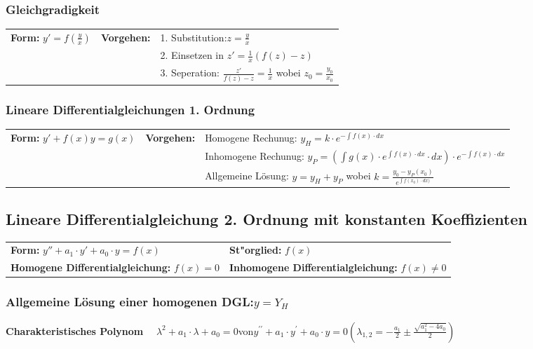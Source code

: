\subsubsection{Gleichgradigkeit}
\begin{tabular}{p{4cm}p{1.5cm}p{10.5cm}}
\textbf{Form:} $y'=f(\frac{y}{x})$ &
\textbf{Vorgehen:}                &
1. Substitution:\quad $z=\frac{y}{x}$\\ &&
2. Einsetzen in $z'=\frac{1}{x}(f(z)-z)$\\ &&
3. Seperation: $\frac{z'}{f(z)-z} = \frac{1}{x}$ wobei $z_0 = \frac{y_0}{x_0}$ 
\end{tabular}
\newline
\newline

\subsubsection{Lineare Differentialgleichungen 1. Ordnung }
\begin{tabular}{p{4cm}p{1.5cm}p{10.5cm}}
\textbf{Form:} $ y'+f(x)y = g(x) $ &
\textbf{Vorgehen:}                 &
Homogene Rechunug: $y_H = k \cdot e^{-\int f(x) \cdot dx}$\\ &&
Inhomogene Rechunug: $y_P = (\int g(x) \cdot e^{\int f(x) \cdot dx} \cdot dx)
\cdot e^{-\int f(x) \cdot dx}$\\ &&
Allgemeine Lösung: $y = y_H + y_P$ wobei $k = \frac{y_0 - y_P(x_0)}{e^{\int
f(x_0) \cdot dx)}}$
\end{tabular}

\subsection{Lineare Differentialgleichung 2. Ordnung mit konstanten 
Koeffizienten }
\begin{tabular}{p{8cm}p{8cm}}
\textbf{Form:} $y''+a_1\cdot y'+a_0\cdot y=f(x)$  &
\textbf{St"orglied:} $f(x)$\\
\textbf{Homogene Differentialgleichung:} $f(x)=0$ &
\textbf{Inhomogene Differentialgleichung:} $f(x)\neq 0$
\end{tabular}

\subsubsection{Allgemeine Lösung einer homogenen DGL:\quad $y=Y_H$}
\textbf{Charakteristisches Polynom} $\quad \lambda^{2}+a_{1} \cdot \lambda+a_{0}=0$\quad  von\quad $y^{\prime \prime}+a_{1} \cdot y^{\prime}+a_{0} \cdot y=0$\quad $\left(\lambda_{1,2}=-\frac{a_{1}}{2} \pm \frac{\sqrt{a_{1}^{2}-4 a_{0}}}{2}\right)$

